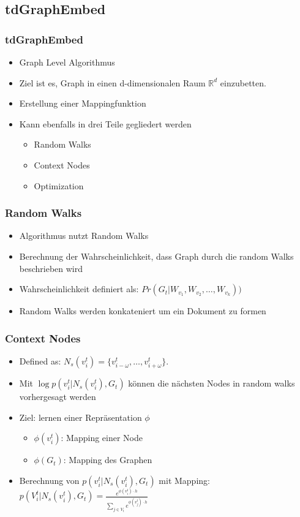 \documentclass{beamer}
\begin{document}
\subsection{tdGraphEmbed}
\begin{frame}
  \frametitle{tdGraphEmbed}
  \begin{itemize}
    \item Graph Level Algorithmus
    \item Ziel ist es, Graph in einen d-dimensionalen Raum \(\mathbb{R}^d\) einzubetten.
    \item Erstellung einer Mappingfunktion
    \item Kann ebenfalls in drei Teile gegliedert werden
    \begin{itemize}
      \item Random Walks
      \item Context Nodes
      \item Optimization
    \end{itemize}
  \end{itemize}
\end{frame}

\begin{frame}
  \frametitle{Random Walks}
  \begin{itemize}
    \item Algorithmus nutzt Random Walks
    \item Berechnung der Wahrscheinlichkeit, dass Graph durch die random Walks beschrieben wird
    \item Wahrscheinlichkeit definiert als:   \(Pr(G_t|W_{v_1}, W_{v_2},\ldots, W_{v_k}))\)
    \item Random Walks werden konkateniert um ein Dokument zu formen
  \end{itemize}
\end{frame}

\begin{frame}
  \frametitle{Context Nodes}
  \begin{itemize}
    \item Defined as:   \(N_s(v_i^t)=\{v_{i-\omega}^t, \ldots, v_{i+\omega}^t\}\).
    \item Mit \(\log{p(v_i^t | N_s(v_i^t), G_t)}\) können die nächsten Nodes in random walks vorhergesagt werden
    \item Ziel: lernen einer Repräsentation \(\phi\)
    \begin{itemize}
      \item \(\phi(v_i^t)\): Mapping einer Node 
      \item \(\phi(G_t)\): Mapping des Graphen
    \end{itemize}
    \item Berechnung von \(p(v_i^t | N_s(v_i^t), G_t)\) mit Mapping: 
    \(p(V_i^t|N_s(v_i^t), G_t) = \frac{e^{\phi(v_i^t) \cdot h}}{\sum\limits_{j \in V_t} e^{\phi(v_j^t) \cdot h}} \)

  \end{itemize}
\end{frame}
\end{document}
